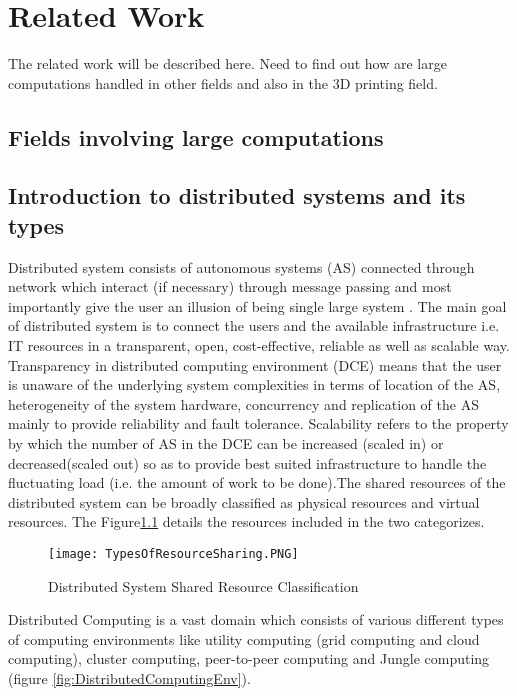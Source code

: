 \chapter{Related Work}
The related work will be described here. Need to find out how are large computations handled in other fields and also in the 3D printing field. 
\section{Fields involving large computations}

\section{Introduction to distributed systems and its types}
Distributed system consists of autonomous systems (AS) connected through network which interact (if necessary) through message passing and most importantly give the user an illusion of being single large system \cite{DCE}. The main goal of distributed system is to connect the users and the available infrastructure i.e. IT resources in a transparent, open, cost-effective, reliable as well as scalable way. Transparency in distributed computing environment (DCE) means that the user is unaware of the underlying system complexities in terms of location of the AS, heterogeneity of the system hardware, concurrency and replication of the AS mainly to provide reliability and fault tolerance. Scalability refers to the property by which the number of AS in the DCE can be increased (scaled in) or decreased(scaled out) so as to provide best suited infrastructure to handle the fluctuating load (i.e. the amount of work to be done).The shared resources of the distributed system can be broadly classified as physical resources and virtual resources. The Figure\ref{fig:TypesOfResourceSharing} details the resources included in the two categorizes. 

\begin{figure}[ht!]
\centering
\texttt{[image: TypesOfResourceSharing.PNG]}
\caption{Distributed System Shared Resource Classification}
\label{fig:TypesOfResourceSharing}
\end{figure}
  
Distributed Computing is a vast domain which consists of various different types of computing environments like utility computing (grid computing and cloud computing), cluster computing, peer-to-peer computing and Jungle computing (figure \ref{fig:DistributedComputingEnv}). 

